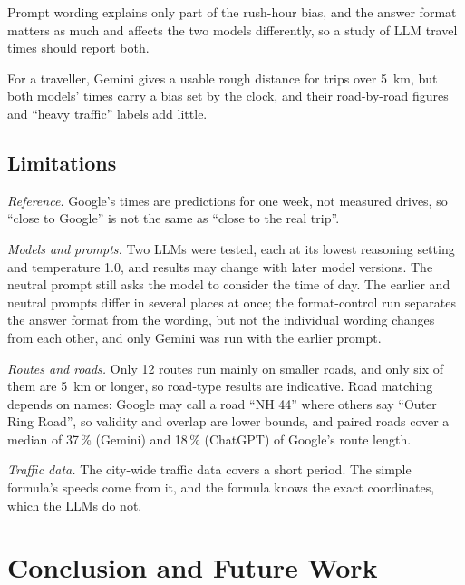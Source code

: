 \documentclass[conference]{IEEEtran}
\begin{document}
Prompt wording explains only part of the rush-hour bias, and the answer format matters as much and affects the two models differently, so a study of LLM travel times should report both.

For a traveller, Gemini gives a usable rough distance for trips over 5~km, but both models' times carry a bias set by the clock, and their road-by-road figures and ``heavy traffic'' labels add little.

\subsection{Limitations}
\emph{Reference.} Google's times are predictions for one week, not measured drives, so ``close to Google'' is not the same as ``close to the real trip''.

\emph{Models and prompts.} Two LLMs were tested, each at its lowest reasoning setting and temperature 1.0, and results may change with later model versions. The neutral prompt still asks the model to consider the time of day. The earlier and neutral prompts differ in several places at once; the format-control run separates the answer format from the wording, but not the individual wording changes from each other, and only Gemini was run with the earlier prompt.

\emph{Routes and roads.} Only 12 routes run mainly on smaller roads, and only six of them are 5~km or longer, so road-type results are indicative. Road matching depends on names: Google may call a road ``NH 44'' where others say ``Outer Ring Road'', so validity and overlap are lower bounds, and paired roads cover a median of 37\,\% (Gemini) and 18\,\% (ChatGPT) of Google's route length.

\emph{Traffic data.} The city-wide traffic data covers a short period. The simple formula's speeds come from it, and the formula knows the exact coordinates, which the LLMs do not.

\section{Conclusion and Future Work}\label{sec:conclusion}
\end{document}
